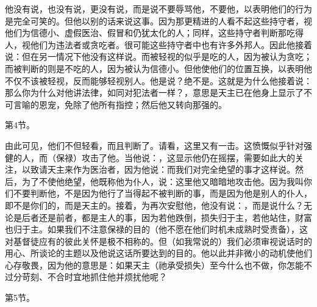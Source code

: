 他没有说，也没有说，更没有说，而是说不要辱骂他，不要他，以表明他们的行为是完全可笑的。但他以别的话来说这事。因为那更精进的人看不起这些持守者，视他们为信德小、虚假医治、假冒和仍犹太化的人；同样，这些持守者判断那吃得人，视他们为违法者或贪吃者。很可能这些持守者中也有许多外邦人。因此他接着说：但在另一情况下他没有这样说。而被轻视的似乎是吃的人，因为被认为贪吃；而被判断的则是不吃的人，因为被认为信德小。但他使他们的位置互换，以表明他不仅不该被轻视，反而能够轻视别人。他是说？绝不是。这就是为什么他接着说：那么你为什么对他讲法律，如同对犯法者一样？，意思是天主已在他身上显示了不可言喻的恩宠，免除了他所有指控；然后他又转向那强的。\par

第4节。\par

由此可见，他们不但轻看，而且判断了。请看，这里又有一击。这愤慨似乎针对强健的人，而（保禄）攻击了他。当他说：，这显示他仍在摇摆，需要如此大的关注，以致请天主来作为医治者，因为他说：而我们对完全绝望的事才这样说。然后，为了不使他绝望，他既称他为仆人，说：这里他又暗暗地攻击他。因为我叫你们不要判断他，不是因为他行了当得起不被判断的事，而是因为他是别人的仆人，即不是你们的，而是天主的。接着，为再次安慰他，他没有说：，而是说什么？无论是后者还是前者，都是主人的事，因为若他跌倒，损失归于主，若他站住，财富也归于主。如果我们不注意保禄的目的（他不愿在他们时机未成熟时受责备），这对基督徒应有的彼此关怀是极不相称的。但（如我常说的）我们必须审视说话时的用心、所谈论的主题以及他说这话所要达到的目的。他以此并非微小的动机使他们心存敬畏，因为他的意思是：如果天主（祂承受损失）至今什么也不做，你怎能不过分苛刻、不合时宜地抓住他并烦扰他呢？\par

第5节。\par

